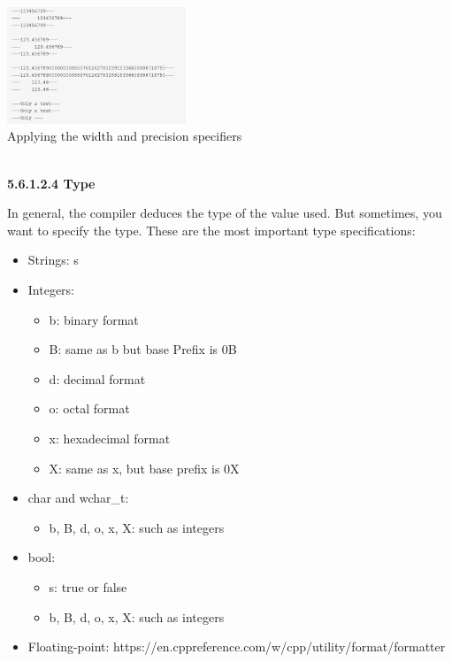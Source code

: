 \begin{center}
\includegraphics[width=0.4\textwidth]{content/3/chapter5/images/30.png}\\
Applying the width and precision specifiers
\end{center}

\hspace*{\fill} \\ %
\noindent
\textbf{5.6.1.2.4\hspace{0.2cm} Type}

In general, the compiler deduces the type of the value used. But sometimes, you want to specify the type. These are the most important type specifications:

\begin{itemize}
\item 
Strings: s

\item 
Integers:
\begin{itemize}
\item 
b: binary format

\item 
B: same as b but base Prefix is 0B

\item 
d: decimal format

\item 
o: octal format

\item 
x: hexadecimal format

\item 
X: same as x, but base prefix is 0X
\end{itemize}

\item 
char and wchar\_t:
\begin{itemize}
\item 
b, B, d, o, x, X: such as integers
\end{itemize}

\item 
bool:
\begin{itemize}
\item 
s: true or false

\item 
b, B, d, o, x, X: such as integers
\end{itemize}

\item 
Floating-point:
https://en.cppreference.com/w/cpp/utility/format/formatter
\end{itemize}

